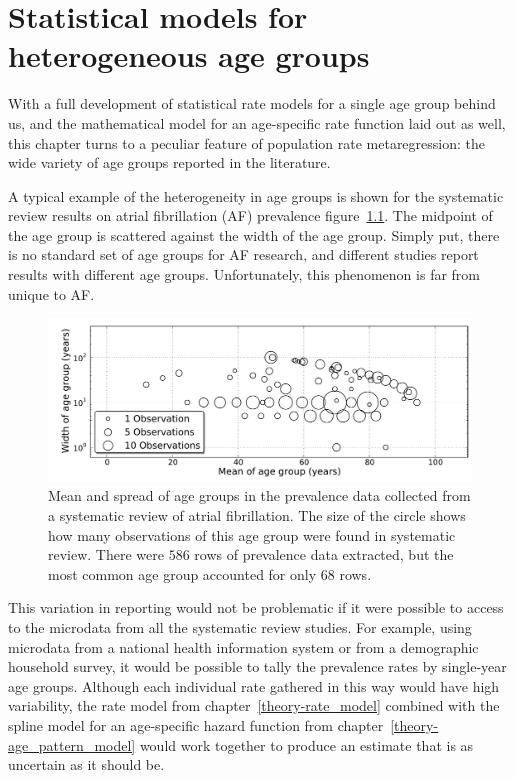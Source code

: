 \chapter{Statistical models for heterogeneous age groups}
\label{chap:age_group_model}
With a full development of statistical rate models for a single age group
behind us, and the mathematical model for an age-specific rate
function laid out as well, this chapter turns to a peculiar feature of
population rate metaregression: the wide variety of age groups reported
in the literature.

A typical example of the heterogeneity in age groups is shown for
the systematic review results on atrial fibrillation (AF)
prevalence\cite{vos_global_2012}
figure~\ref{age-group-model-af-age-groups}.  The midpoint of the
age group is scattered against the width of the age group.  Simply put,
there is no standard set of age groups for AF research, and different
studies report results with different age groups. Unfortunately, this
phenomenon is far from unique to AF.

\begin{figure}[h]
\begin{center}
\includegraphics[width=\textwidth]{af_age_groups_scatter.pdf}
\end{center}
\caption[Mean and spread of age groups collected from a 
  systematic review of atrial fibrillation.]{Mean and spread 
  of age groups in the prevalence data
  collected from a systematic review of atrial fibrillation. The
  size of the circle shows how many observations of this age group
  were found in systematic review. There were
  $586$ rows of prevalence data
  extracted, but the most common age group accounted for only
  $68$ rows.}
\label{age-group-model-af-age-groups}
\end{figure}

This variation in reporting would not be problematic if it were possible to access
to the microdata from all the systematic review studies.  For
example, using microdata from a national health information system or
from a demographic household survey, it would be possible to tally the
prevalence rates by single-year age groups.  Although each individual
rate gathered in this way would have high variability, the rate model
from chapter~\ref{theory-rate_model} combined with the spline model
for an age-specific hazard function from chapter~\ref{theory-age_pattern_model} would
work together to produce an estimate that is as uncertain as it should be.

